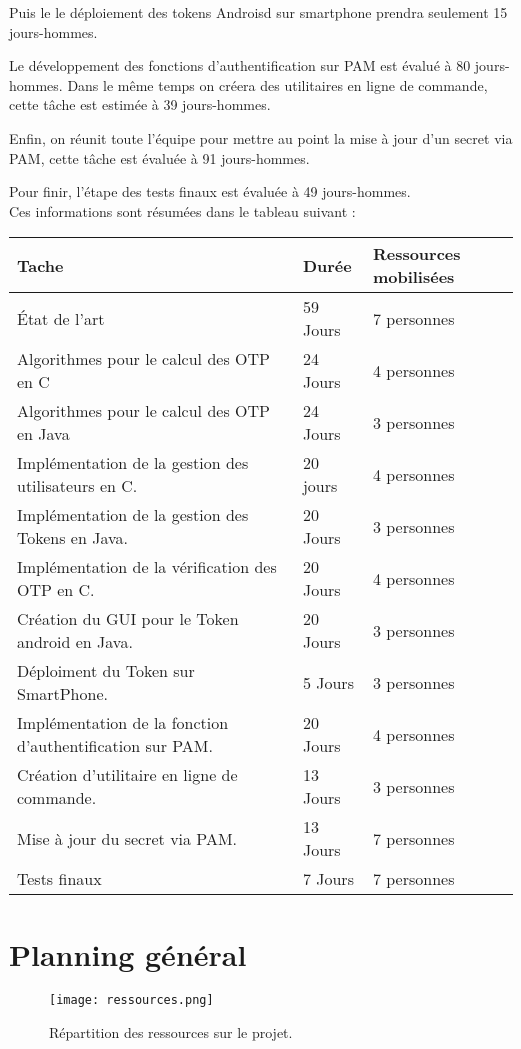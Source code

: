 \documentclass{../../res/univ-projet}
\begin{document}
	Puis le le déploiement des tokens Androisd sur smartphone prendra seulement 15 jours-hommes.
	
	Le développement des fonctions d'authentification sur PAM est évalué à 80 jours-hommes. Dans le même temps on créera des utilitaires en ligne de commande, cette tâche est estimée à 39 jours-hommes.
	
	Enfin, on réunit toute l'équipe pour mettre au point la mise à jour d'un secret via PAM, cette tâche est évaluée à 91 jours-hommes.
	
	Pour finir, l'étape des tests finaux est évaluée à 49 jours-hommes.\\
	
	Ces informations sont résumées dans le tableau suivant :
	
	\begin{tabular}{|l|l|l|}
	 	\hline
		Tache & Durée & Ressources mobilisées \\ \hline
		État de l'art & 59 Jours & 7 personnes \\
		Algorithmes pour le calcul des OTP en C & 24 Jours & 4 personnes \\
		Algorithmes pour le calcul des OTP en Java & 24 Jours & 3 personnes \\
		Implémentation de la gestion des utilisateurs en C. & 20 jours & 4 personnes \\
		Implémentation de la gestion des Tokens en Java. & 20 Jours & 3 personnes \\
		Implémentation de la vérification des OTP en C. & 20 Jours & 4 personnes \\
	  	Création du GUI pour le Token android en Java. & 20 Jours & 3 personnes \\
		Déploiment du Token sur SmartPhone. & 5 Jours & 3 personnes \\
	  	Implémentation de la fonction d'authentification sur PAM. & 20 Jours & 4 personnes \\
	  	Création d'utilitaire en ligne de commande. & 13 Jours & 3 personnes \\
	  	Mise à jour du secret via PAM. & 13 Jours & 7 personnes \\
		Tests finaux & 7 Jours & 7 personnes \\ \hline
	\end{tabular}

\newpage
\section{Planning général}
	\begin{figure}[h]
		\texttt{[image: ressources.png]}
		\caption{Répartition des ressources sur le projet.}
	\end{figure}
	
\end{document}
